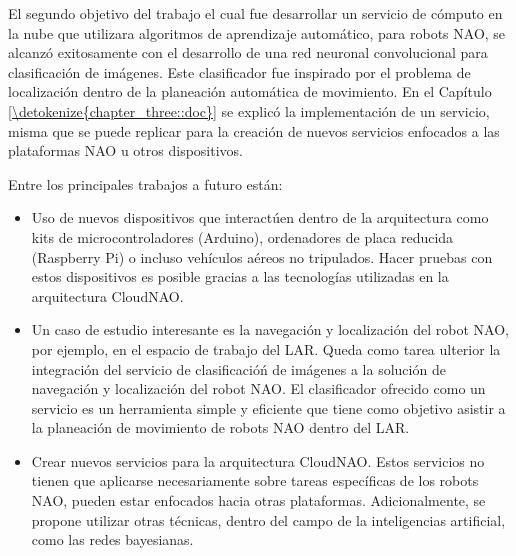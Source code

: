 El segundo objetivo del trabajo el cual fue desarrollar un servicio de cómputo en la nube que utilizara
algoritmos de aprendizaje automático, para robots NAO, se 
alcanzó exitosamente con el desarrollo
de una red neuronal convolucional para clasificación
de imágenes. Este clasificador fue inspirado
por el problema de localización dentro de la planeación 
automática de movimiento.
En el Capítulo \ref{\detokenize{chapter_three::doc}} se explicó
la implementación de un servicio, misma que se puede 
replicar para la creación de nuevos servicios
enfocados a las plataformas NAO u otros dispositivos.

Entre los principales trabajos a futuro están:

\begin{itemize}
    \item Uso de nuevos dispositivos
que interactúen dentro de la arquitectura como
kits de microcontroladores (Arduino), ordenadores
de placa reducida (Raspberry Pi) o incluso 
vehículos aéreos no tripulados. Hacer pruebas con estos 
dispositivos es posible gracias a las tecnologías 
utilizadas en la arquitectura CloudNAO.
\item Un caso de estudio interesante es la navegación y localización del robot NAO, por ejemplo, en el espacio de trabajo del LAR.
Queda como tarea ulterior la integración del servicio de clasificacióń de imágenes a la solución de navegación y localización del robot NAO. El clasificador ofrecido como un servicio es un herramienta simple y 
eficiente que tiene como objetivo asistir a la planeación de movimiento de robots NAO dentro del LAR.
\item Crear nuevos servicios para la arquitectura CloudNAO. Estos 
servicios no tienen que aplicarse necesariamente
sobre tareas específicas de los robots NAO, pueden estar enfocados
hacia otras plataformas. Adicionalmente, se propone utilizar otras
técnicas, dentro del campo de la inteligencias artificial, como
las redes bayesianas.
\end{itemize}


